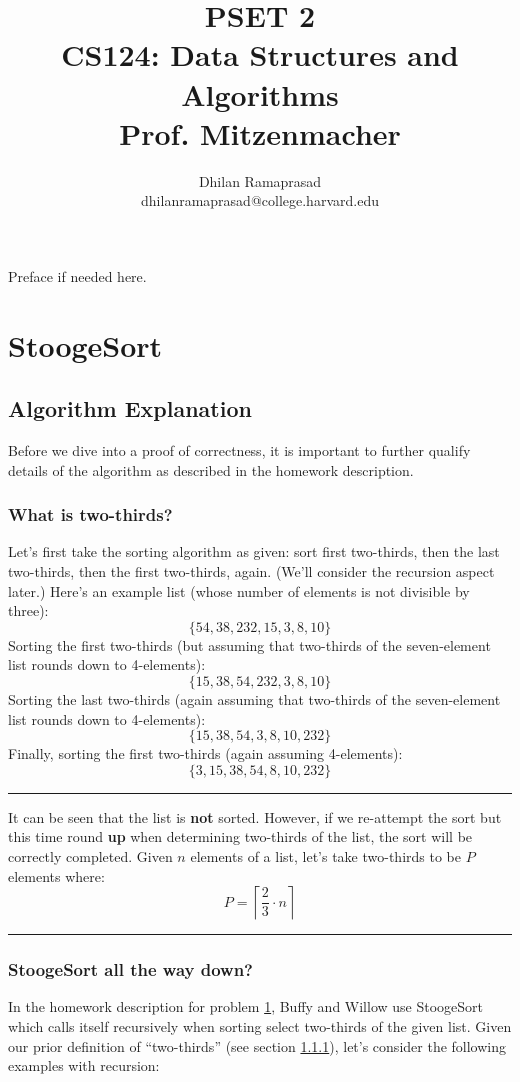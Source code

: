 \documentclass[conference]{styles/acmsiggraph}
\title{\huge PSET 2 \\ \LARGE {CS124: Data Structures and Algorithms \\ Prof. Mitzenmacher}}
\author{\Large Dhilan Ramaprasad \\ dhilanramaprasad@college.harvard.edu}
\newcommand{\?}{\stackrel{?}{=}}
\begin{document}
\maketitle

Preface if needed here.


\section{StoogeSort} \label{number1}

\subsection{Algorithm Explanation}
Before we dive into a proof of correctness, it is important to further qualify details of the algorithm as described in the homework description.  

\subsubsection{What is two-thirds?} \label{two-thirds}
Let's first take the sorting algorithm as given: sort first two-thirds, then the last two-thirds, then the first two-thirds, again.  (We'll consider the recursion aspect later.)  Here's an example list (whose number of elements is not divisible by three):
$$\{54, 38, 232, 15, 3, 8, 10\}$$
Sorting the first two-thirds (but assuming that two-thirds of the seven-element list rounds down to 4-elements):
$$\{15, 38, 54, 232, 3, 8, 10\}$$
Sorting the last two-thirds (again assuming that two-thirds of the seven-element list rounds down to 4-elements):
$$\{15, 38, 54, 3, 8, 10, 232\}$$
Finally, sorting the first two-thirds (again assuming 4-elements):
$$\{3, 15, 38, 54, 8, 10, 232\}$$

\rule{\textwidth}{0.4pt}
It can be seen that the list is \textbf{not} sorted.  However, if we re-attempt the sort but this time round \textbf{up} when determining two-thirds of the list, the sort will be correctly completed.  Given $n$ elements of a list, let's take two-thirds to be $P$ elements where:
$$P = \left\lceil\frac{2}{3}\cdot n\right\rceil$$
\rule{\textwidth}{0.4pt}

\subsubsection{StoogeSort all the way down?} \label{section:requirements}
In the homework description for problem \ref{number1}, Buffy and Willow use StoogeSort which calls itself recursively when sorting select two-thirds of the given list.  Given our prior definition of \enquote{two-thirds} (see section \ref{two-thirds}), let's consider the following examples with recursion:
\end{document}
